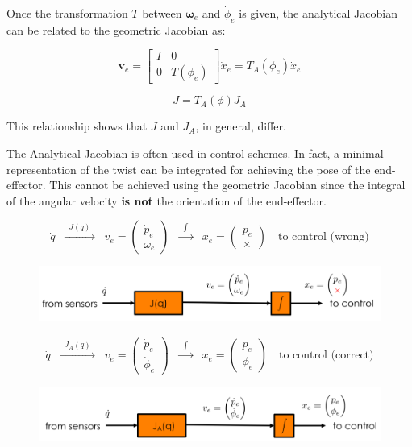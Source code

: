 Once the transformation $T$ between $\boldsymbol{\omega}_e$ and $\dot{\phi}_e$ is given, the analytical Jacobian can be related to the geometric Jacobian as:

\[
\boldsymbol{v}_e =
\begin{bmatrix}
I & 0 \\
0 & T(\phi_e)
\end{bmatrix}
\dot{x}_e
= T_A(\phi_e)\dot{x}_e
\]

\[
J = T_A(\phi) J_A
\]

This relationship shows that $J$ and $J_A$, in general, differ.

The Analytical Jacobian is often used in control schemes. In fact, a minimal representation of the twist can be integrated for achieving the pose of the end-effector. This cannot be achieved using the geometric Jacobian since the integral of the angular velocity \textbf{is not} the orientation of the end-effector.

\[
\dot{q} \;\; \xrightarrow{\;\; J(q) \;\;} \;\; 
v_e = 
\begin{pmatrix}
\dot{p}_e \\ 
\omega_e
\end{pmatrix}
\;\; \xrightarrow{\;\; \int \;\;} \;\;
x_e = 
\begin{pmatrix}
p_e \\ 
\times
\end{pmatrix}
\quad \text{to control (wrong)}
\]

\begin{figure}[H]
    \centering
    \includegraphics[width=0.85\linewidth]{imgs/diff_kine_1.png}
\end{figure}

\[
\dot{q} \;\; \xrightarrow{\;\; J_A(q) \;\;} \;\; 
v_e = 
\begin{pmatrix}
\dot{p}_e \\ 
\dot{\phi}_e
\end{pmatrix}
\;\; \xrightarrow{\;\; \int \;\;} \;\;
x_e = 
\begin{pmatrix}
p_e \\ 
\phi_e
\end{pmatrix}
\quad \text{to control (correct)}
\]

\begin{figure}[H]
    \centering
    \includegraphics[width=0.85\linewidth]{imgs/diff_kine_2.png}
\end{figure}

